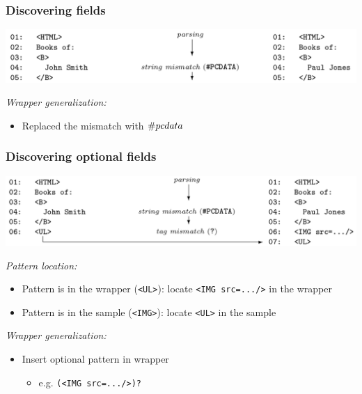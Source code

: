 \documentclass[svgnames]{beamer}
\begin{document}

\begin{frame}
    \frametitle{Discovering fields}

    \begin{center}        
        \includegraphics[width=\linewidth]{string-mismatch}
    \end{center}

    \emph{Wrapper generalization:}
    \begin{itemize}
    \item<2-> Replaced the mismatch with $\#pcdata$
    \end{itemize}

\end{frame}


\begin{frame}
    \frametitle{Discovering optional fields}
    
    \begin{center}        
        \includegraphics[width=\linewidth]{tag-mismatch}
    \end{center}

    \emph{Pattern location:}
    \begin{itemize}
    \item<2-> Pattern is in the wrapper (\texttt{<UL>}): locate \texttt{<IMG src=.../>} in the
        wrapper
    \item<2-> Pattern is in the sample (\texttt{<IMG>}): locate \texttt{<UL>} in
        the sample
    \end{itemize}

    \emph{Wrapper generalization:}
    \begin{itemize}
    \item<3-> Insert optional pattern in wrapper
        \begin{itemize}
        \item e.g. \texttt{(<IMG src=.../>)?}
        \end{itemize}
    \end{itemize}
    
\end{frame}
\end{document}
